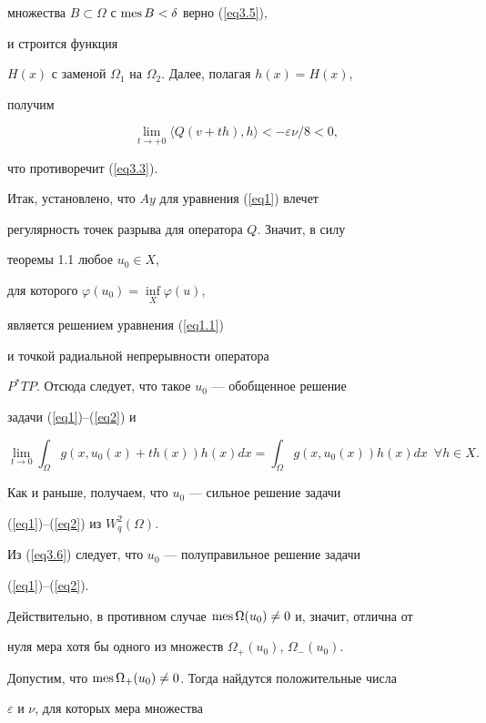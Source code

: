 множества $B\subset \Omega$ с $\operatorname{mes} B<\delta$ верно (\ref{eq3.5}),


и строится функция


$H(x)$ с заменой $\Omega_1$ на $\Omega_2$. Далее, полагая $h(x)=H(x)$,


получим


$$


\lim\limits_{t \to +0} \langle Q(v+th),h \rangle <-\varepsilon\nu/8<0,


$$


что противоречит (\ref{eq3.3}).


Итак, установлено, что $Ay$ для уравнения (\ref{eq1}) влечет


регулярность точек разрыва для оператора $Q$. Значит, в силу


теоремы 1.1 любое $u_0 \in X$,


для которого $\varphi(u_0)=\inf\limits_X\varphi(u)$,


является решением уравнения (\ref{eq1.1})


и точкой радиальной непрерывности оператора


$P^*TP$. Отсюда следует, что такое $u_0$ --- обобщенное решение


задачи (\ref{eq1})--(\ref{eq2}) и


\begin{equation}


\label{eq3.6}


\lim_{t \to 0}\int_\Omega g(x,u_0(x)+th(x)) h(x) dx=


\int_\Omega g(x,u_0(x)) h(x) dx \ \; \forall h \in X.


\end{equation}


Как и раньше, получаем, что $u_0$ --- сильное решение задачи


(\ref{eq1})--(\ref{eq2}) из $W^2_q(\Omega)$.





Из (\ref{eq3.6}) следует, что $u_0$ --- полуправильное решение задачи


(\ref{eq1})--(\ref{eq2}).


Действительно, в противном случае $\operatorname{mes}\Omega(u_0)\ne 0$ и, значит, отлична от


нуля мера хотя бы одного из множеств $\Omega_{+}(u_0)$, $\Omega_{-}(u_0)$.


Допустим, что $\operatorname{mes}\Omega_{+}(u_0)\ne 0$. Тогда найдутся положительные числа


$\varepsilon$ и $\nu$, для которых мера множества


